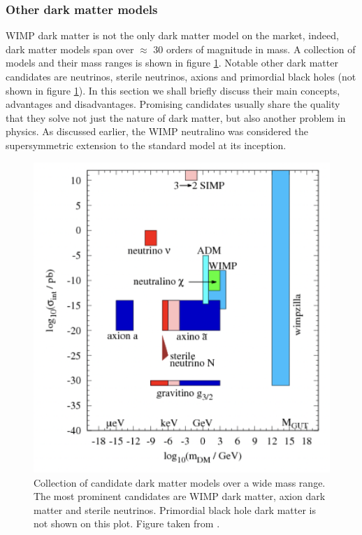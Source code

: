 \subsubsection{Other dark matter models}\label{IntroOtherDM}
WIMP dark matter is not the only dark matter model on the market, indeed, dark matter models span over $\approx$ 30 orders of magnitude in mass. A collection of models and their mass ranges is shown in figure \ref{fig:DarkMatterModelsSummary}. Notable other dark matter candidates are neutrinos, sterile neutrinos, axions and primordial black holes (not shown in figure \ref{fig:DarkMatterModelsSummary}). In this section we shall briefly discuss their main concepts, advantages and disadvantages. Promising candidates usually share the quality that they solve not just the nature of dark matter, but also another problem in physics. As discussed earlier, the WIMP neutralino was considered the supersymmetric extension to the standard model at its inception.\\

\begin{figure}[h!]
    \centering
    \includegraphics[width=\textwidth]{figures/DM_summary_models.png}
    \caption{Collection of candidate dark matter models over a wide mass range. The most prominent candidates are WIMP dark matter, axion dark matter and sterile neutrinos. Primordial black hole dark matter is not shown on this plot. Figure taken from \cite{BAER20151}.}
    \label{fig:DarkMatterModelsSummary}
\end{figure}



